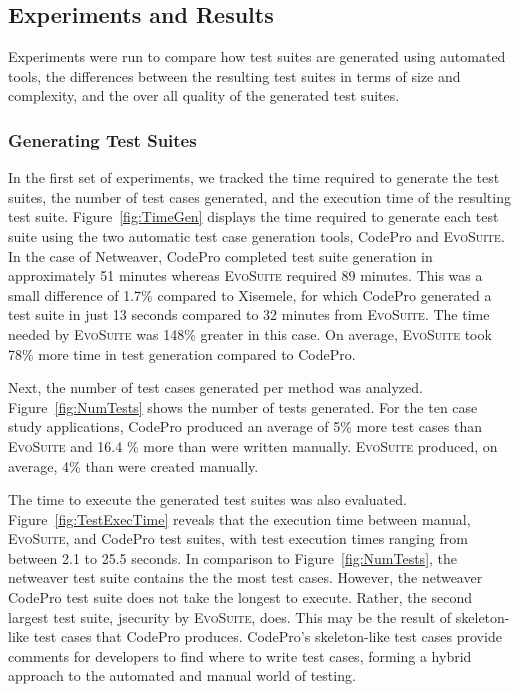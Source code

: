 \subsection{Experiments and Results}
Experiments were run to compare how test suites are generated using automated tools, the differences between the resulting test suites in terms of size and complexity, and the over all quality of the generated test suites.  

\subsubsection{Generating Test Suites }
In the first set of experiments, we tracked the time required to generate the test suites, the number of test cases generated, and the execution time of the resulting test suite.  Figure~\ref{fig:TimeGen} displays the time required to generate each test suite using the two automatic test case generation tools, CodePro and \textsc{EvoSuite}.  In the case of Netweaver, CodePro completed test suite generation in approximately 51 minutes whereas \textsc{EvoSuite} required 89 minutes.  This was a small difference of 1.7\% compared to Xisemele, for which CodePro generated a test suite in just 13 seconds compared to 32 minutes from \textsc{EvoSuite}.  The time needed by \textsc{EvoSuite} was 148\% greater in this case.  On average, \textsc{EvoSuite} took 78\% more time in test generation compared to CodePro.

Next, the number of test cases generated per method was analyzed.  Figure~\ref{fig:NumTests} shows the number of tests generated.  For the ten case study applications, CodePro produced an average of  5\% more test cases than \textsc{EvoSuite} and 16.4 \% more than were written manually.  \textsc{EvoSuite} produced, on average, 4\% than were created manually. 

The time to execute the generated test suites was also evaluated. Figure~\ref{fig:TestExecTime} reveals that the execution time between manual, \textsc{EvoSuite}, and CodePro test suites, with test execution times ranging from between 2.1 to 25.5 seconds. In comparison to Figure~\ref{fig:NumTests}, the netweaver test suite contains the the most test cases. However, the netweaver CodePro test suite does not take the longest to execute.  Rather, the second largest test suite, jsecurity by \textsc{EvoSuite}, does. This may be the result of skeleton-like test cases that CodePro produces. CodePro's skeleton-like test cases provide comments for developers to find where to write test cases, forming a hybrid approach to the automated and manual world of testing.%

